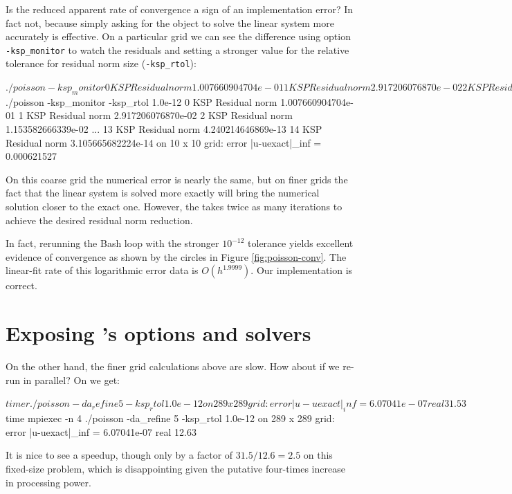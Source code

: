 Is the reduced apparent rate of convergence a sign of an implementation error?  In fact not, because simply asking for the \pKSP object to solve the linear system more accurately is effective.  On a particular grid we can see the difference using option \texttt{-ksp\_monitor} to watch the residuals and setting a stronger value for the \pKSP relative tolerance for residual norm size (\texttt{-ksp\_rtol}):
\begin{cline}
$ ./poisson -ksp_monitor
  0 KSP Residual norm 1.007660904704e-01 
  1 KSP Residual norm 2.917206076870e-02 
  2 KSP Residual norm 1.153582666339e-02 
... 
  6 KSP Residual norm 6.995040432502e-06 
  7 KSP Residual norm 8.593881990968e-07 
on 10 x 10 grid:  error |u-uexact|_inf = 0.000621778
$ ./poisson -ksp_monitor -ksp_rtol 1.0e-12
  0 KSP Residual norm 1.007660904704e-01 
  1 KSP Residual norm 2.917206076870e-02 
  2 KSP Residual norm 1.153582666339e-02 
...
 13 KSP Residual norm 4.240214646869e-13 
 14 KSP Residual norm 3.105665682224e-14 
on 10 x 10 grid:  error |u-uexact|_inf = 0.000621527
\end{cline}
On this coarse grid the numerical error is nearly the same, but on finer grids the fact that the linear system is solved more exactly will bring the numerical solution closer to the exact one.  However, the \pKSP takes twice as many iterations to achieve the desired residual norm reduction.

In fact, rerunning the Bash loop with the stronger $10^{-12}$ tolerance yields excellent evidence of convergence as shown by the circles in Figure \ref{fig:poisson-conv}.  The linear-fit rate of this logarithmic error data is $O(h^{1.9999})$.  Our implementation is correct.


\section{Exposing \PETSc's options and solvers}

On the other hand, the finer grid calculations above are slow.  How about if we re-run in parallel?  On \WORKSTATION we get:
\begin{cline}
$ timer ./poisson -da_refine 5 -ksp_rtol 1.0e-12
on 289 x 289 grid:  error |u-uexact|_inf = 6.07041e-07
real 31.53
$ time mpiexec -n 4 ./poisson -da_refine 5 -ksp_rtol 1.0e-12
on 289 x 289 grid:  error |u-uexact|_inf = 6.07041e-07
real 12.63
\end{cline}
It is nice to see a speedup, though only by a factor of $31.5/12.6 = 2.5$ on this fixed-size problem, which is disappointing given the putative four-times increase in processing power.

